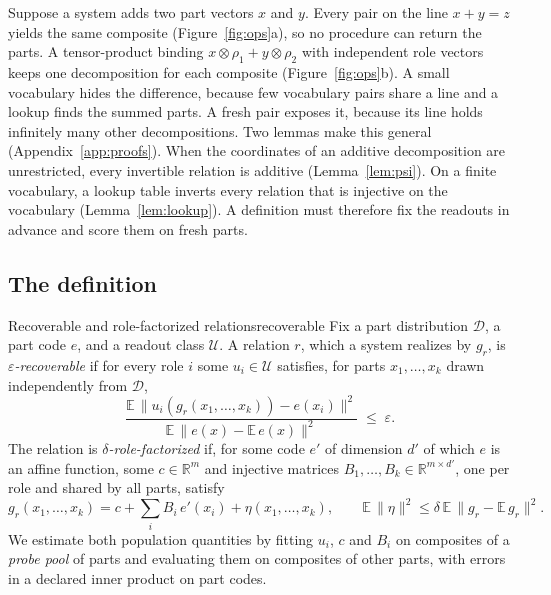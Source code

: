 \documentclass[10pt]{article}
\theoremstyle{plain}
\theoremstyle{remark}
\newcommand{\R}{\mathbb{R}}
\newcommand{\U}{\mathcal{U}}
\newcommand{\D}{\mathcal{D}}
\begin{document}
Suppose a system adds two part vectors $x$ and $y$. Every pair on the line $x + y = z$ yields the same composite (Figure~\ref{fig:ops}a), so no procedure can return the parts. A tensor-product binding $x \otimes \rho_1 + y \otimes \rho_2$ with independent role vectors keeps one decomposition for each composite (Figure~\ref{fig:ops}b). A small vocabulary hides the difference, because few vocabulary pairs share a line and a lookup finds the summed parts. A fresh pair exposes it, because its line holds infinitely many other decompositions. Two lemmas make this general (Appendix~\ref{app:proofs}). When the coordinates of an additive decomposition are unrestricted, every invertible relation is additive (Lemma~\ref{lem:psi}). On a finite vocabulary, a lookup table inverts every relation that is injective on the vocabulary (Lemma~\ref{lem:lookup}). A definition must therefore fix the readouts in advance and score them on fresh parts.

\subsection{The definition}

\begin{defbox}{Recoverable and role-factorized relations}{recoverable}
Fix a part distribution $\D$, a part code $e$, and a readout class $\U$. A relation $r$, which a system realizes by $g_r$, is \emph{$\varepsilon$-recoverable} if for every role $i$ some $u_i \in \U$ satisfies, for parts $x_1, \ldots, x_k$ drawn independently from $\D$,
\begin{equation}
  \frac{\mathbb{E}\,\lVert u_i(g_r(x_1,\ldots,x_k)) - e(x_i) \rVert^2}{\mathbb{E}\,\lVert e(x) - \mathbb{E}\,e(x) \rVert^2} \;\le\; \varepsilon .
  \label{eq:recover}
\end{equation}
The relation is \emph{$\delta$-role-factorized} if, for some code $e'$ of dimension $d'$ of which $e$ is an affine function, some $c \in \R^m$ and injective matrices $B_1, \ldots, B_k \in \R^{m \times d'}$, one per role and shared by all parts, satisfy
\begin{equation}
  g_r(x_1, \ldots, x_k) = c + \textstyle\sum_{i} B_i\, e'(x_i) + \eta(x_1, \ldots, x_k), \qquad \mathbb{E}\,\lVert \eta \rVert^2 \le \delta\, \mathbb{E}\,\lVert g_r - \mathbb{E}\,g_r \rVert^2 .
  \label{eq:factor}
\end{equation}
We estimate both population quantities by fitting $u_i$, $c$ and $B_i$ on composites of a \emph{probe pool} of parts and evaluating them on composites of other parts, with errors in a declared inner product on part codes.
\end{defbox}
\end{document}
